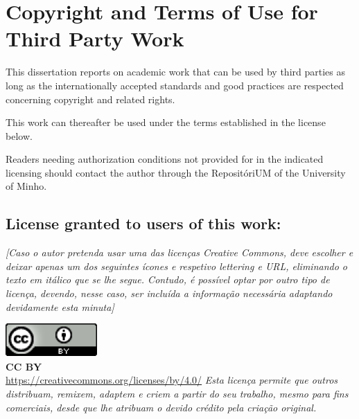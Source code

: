 \chapter*{Copyright and Terms of Use for Third Party Work}
\setlength{\parskip}{1em}
\noindent
This dissertation reports on academic work that can be used by third parties as long as the internationally accepted standards and good practices are respected concerning copyright and related rights.

\noindent
This work can thereafter be used under the terms established in the license below.

\noindent
Readers needing authorization conditions not provided for in the indicated licensing should contact the author through the RepositóriUM of the University of Minho.

\section*{License granted to users of this work:}

\textit{[Caso o autor pretenda usar uma das licenças Creative Commons, deve escolher e deixar apenas um dos seguintes ícones e respetivo lettering e URL, eliminando o texto em itálico que se lhe segue. Contudo, é possível optar por outro tipo de licença, devendo, nesse caso, ser incluída a informação necessária adaptando devidamente esta minuta]}

\noindent
\includegraphics[]{images/CCBY.png}
\\
\textbf{CC BY}
\\
\url{https://creativecommons.org/licenses/by/4.0/}
\textit{Esta licença permite que outros distribuam, remixem, adaptem e criem a partir do seu trabalho, mesmo para fins comerciais, desde que lhe atribuam o devido crédito pela criação original.}

\setlength{\parskip}{0em}